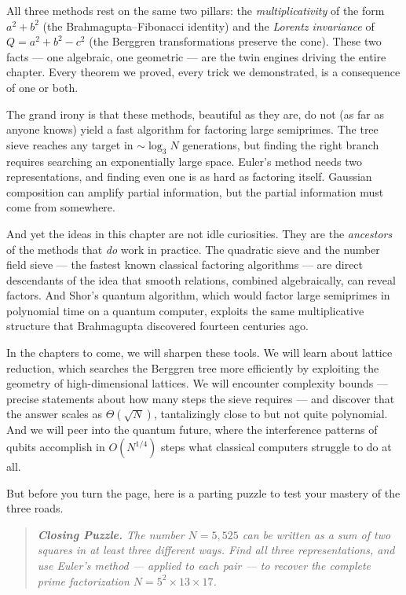 All three methods rest on the same two pillars: the \textit{multiplicativity} of the form $a^2 + b^2$ (the Brahmagupta--Fibonacci identity) and the \textit{Lorentz invariance} of $Q = a^2 + b^2 - c^2$ (the Berggren transformations preserve the cone). These two facts --- one algebraic, one geometric --- are the twin engines driving the entire chapter. Every theorem we proved, every trick we demonstrated, is a consequence of one or both.


The grand irony is that these methods, beautiful as they are, do not (as far as anyone knows) yield a fast algorithm for factoring large semiprimes. The tree sieve reaches any target in $\sim \log_3 N$ generations, but finding the right branch requires searching an exponentially large space. Euler's method needs two representations, and finding even one is as hard as factoring itself. Gaussian composition can amplify partial information, but the partial information must come from somewhere.

And yet the ideas in this chapter are not idle curiosities. They are the \textit{ancestors} of the methods that \textit{do} work in practice. The quadratic sieve and the number field sieve --- the fastest known classical factoring algorithms --- are direct descendants of the idea that smooth relations, combined algebraically, can reveal factors. And Shor's quantum algorithm, which would factor large semiprimes in polynomial time on a quantum computer, exploits the same multiplicative structure that Brahmagupta discovered fourteen centuries ago.

In the chapters to come, we will sharpen these tools. We will learn about lattice reduction, which searches the Berggren tree more efficiently by exploiting the geometry of high-dimensional lattices. We will encounter complexity bounds --- precise statements about how many steps the sieve requires --- and discover that the answer scales as $\Theta(\sqrt{N})$, tantalizingly close to but not quite polynomial. And we will peer into the quantum future, where the interference patterns of qubits accomplish in $O(N^{1/4})$ steps what classical computers struggle to do at all.


But before you turn the page, here is a parting puzzle to test your mastery of the three roads.


\begin{quote}
\itshape
\textbf{Closing Puzzle.} The number $N = 5{,}525$ can be written as a sum of two squares in at least three different ways. Find all three representations, and use Euler's method --- applied to each pair --- to recover the complete prime factorization $N = 5^2 \times 13 \times 17$.
\end{quote}


